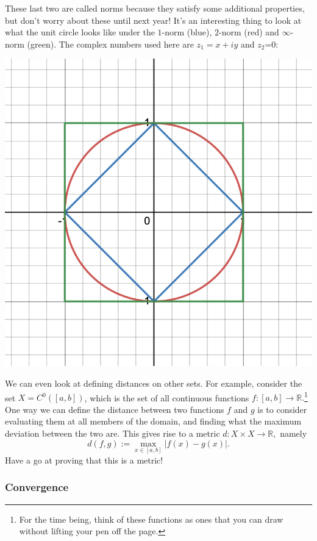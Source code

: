 \documentclass[
  10pt,
  a4paper]{article}
\theoremstyle{plain}
\theoremstyle{definition}
\theoremstyle{plain}
\theoremstyle{plain}
\theoremstyle{plain}
\theoremstyle{plain}
\theoremstyle{definition}
\theoremstyle{definition}
\theoremstyle{remark}
\theoremstyle{remark}
\begin{document}
These last two are called norms because they satisfy some additional properties, but don't worry about these until next year! It's an interesting thing to look at what the unit circle looks like under the \(1\)-norm (blue), \(2\)-norm (red) and \(\infty\)-norm (green). The complex numbers used here are \(z_1 = x + iy\) and \(z_2\)=0:

\includegraphics{unitcircle.png}

We can even look at defining distances on other sets. For example, consider the set \(X = C^{0}([a,b])\), which is the set of all continuous functions \(f:[a,b] \to \mathbb{R}.\)\footnote{For the time being, think of these functions as ones that you can draw without lifting your pen off the page.} One way we can define the distance between two functions \(f\) and \(g\) is to consider evaluating them at all members of the domain, and finding what the maximum deviation between the two are. This gives rise to a metric \(d:X\times X \to \mathbb{R},\) namely \[d(f,g) := \max_{x \in [a,b]} \lvert f(x) - g(x) \rvert.\] Have a go at proving that this is a metric!

\hypertarget{convergence}{%
\subsubsection{Convergence}\label{convergence}}
\end{document}
